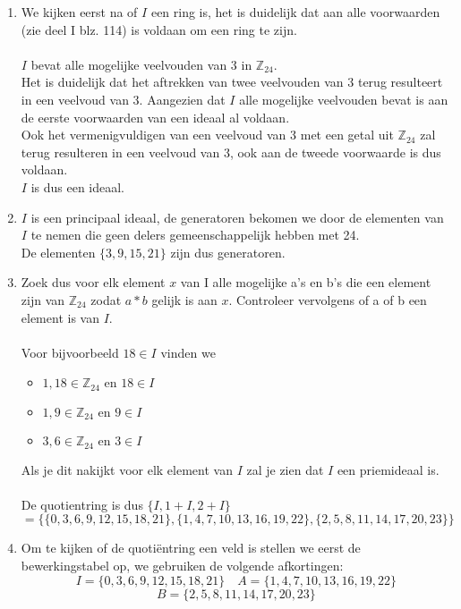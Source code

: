\documentclass[11pt,a4paper,titlepage]{article}
\begin{document}
\begin{enumerate}[label=(\alph*)]
	\item We kijken eerst na of $I$ een ring is, het is duidelijk dat aan alle voorwaarden (zie deel I blz. 114) is voldaan om een ring te zijn.\\ \\
		$I$ bevat alle mogelijke veelvouden van 3 in $\mathbb{Z}_{24}$.\\
		Het is duidelijk dat het aftrekken van twee veelvouden van 3 terug resulteert in een veelvoud van 3. Aangezien dat $I$ alle mogelijke veelvouden bevat 
is aan de eerste voorwaarden van een ideaal al voldaan. \\
		Ook het vermenigvuldigen van een veelvoud van 3 met een getal uit $\mathbb{Z}_{24}$ zal terug resulteren in een veelvoud van 3, ook aan de tweede voorwaarde is dus voldaan.\\
		$I$ is dus een ideaal.
	\item $I$ is een principaal ideaal, de generatoren bekomen we door de elementen van $I$ te nemen die geen delers gemeenschappelijk hebben met 24.\\ 		 		De elementen $\{3,9,15,21\}$ zijn dus generatoren.
	\item Zoek dus voor elk element $x$ van I alle mogelijke a's en b's die een element zijn van $\mathbb{Z}_{24}$ zodat $a*b$ gelijk is aan $x$. Controleer vervolgens of a of b een element is van $I$. \\
		\\Voor bijvoorbeeld $18 \in I$ vinden we 
			\begin{itemize}
				\item $1, 18 \in \mathbb{Z}_{24} \text{ en } 18 \in I$
				\item $1, 9 \in \mathbb{Z}_{24} \text{ en } 9 \in I$
				\item $3, 6 \in \mathbb{Z}_{24} \text{ en } 3 \in I$
			\end{itemize}
		Als je dit nakijkt voor elk element van $I$ zal je zien dat $I$ een priemideaal is. \\ \\
		De quotientring is dus $\{I,1+I,2+I\}$ \\ $ = \{\{0,3,6,9,12,15,18,21\}, \{1,4,7,10,13,16,19,22\},\{2,5,8,11,14,17,20,23\}\}$
	\item Om te kijken of de quotiëntring een veld is stellen we eerst de bewerkingstabel op, we gebruiken de volgende afkortingen:
		$$ I = \{0,3,6,9,12,15,18,21\} \quad A = \{1,4,7,10,13,16,19,22\}$$ $$ B = \{2,5,8,11,14,17,20,23\} $$

\end{enumerate}
\end{document}
